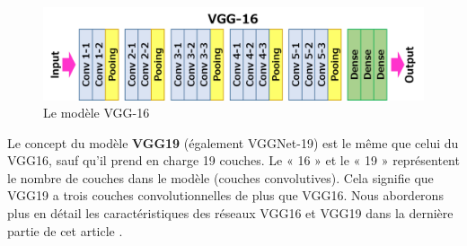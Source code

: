 	
	\begin{figure}[H]%
		\centering
		\includegraphics[width=\textwidth]{images/vgg16.png}
		\caption{Le modèle VGG-16 \cite{tammina2019transfer}}
		\label{fig:VGG16_model}
	\end{figure}

	Le concept du modèle \textbf{VGG19} (également VGGNet-19) est le même que celui du VGG16, sauf qu'il prend en charge 19 couches. Le « 16 » et le « 19 » représentent le nombre de couches dans le modèle (couches convolutives). Cela signifie que VGG19 a trois couches convolutionnelles de plus que VGG16. Nous aborderons plus en détail les caractéristiques des réseaux VGG16 et VGG19 dans la dernière partie de cet article \cite{yu2016visualizing}.


	
	
	
	
	


